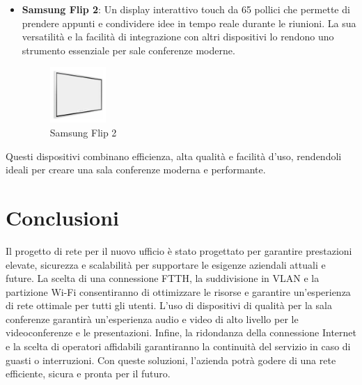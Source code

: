 \documentclass{assignment}
\begin{document}
\begin{itemize}
    \item \textbf{Samsung Flip 2}: Un display interattivo touch da 65 pollici che permette di prendere appunti e condividere idee in tempo reale durante le riunioni. La sua versatilità e la facilità di integrazione con altri dispositivi lo rendono uno strumento essenziale per sale conferenze moderne.
    \begin{figure}[H]
        \centering
        \includegraphics[width=0.2\textwidth]{assets/samsung_flip_2.jpg}
        \caption{Samsung Flip 2}
    \end{figure}
\end{itemize}


Questi dispositivi combinano efficienza, alta qualità e facilità d'uso, rendendoli ideali per creare una sala conferenze moderna e performante.



\section{Conclusioni}
Il progetto di rete per il nuovo ufficio è stato progettato per garantire prestazioni elevate, sicurezza e scalabilità per supportare le esigenze aziendali attuali e future. La scelta di una connessione FTTH, la suddivisione in VLAN e la partizione Wi-Fi consentiranno di ottimizzare le risorse e garantire un'esperienza di rete ottimale per tutti gli utenti. L'uso di dispositivi di qualità per la sala conferenze garantirà un'esperienza audio e video di alto livello per le videoconferenze e le presentazioni. Infine, la ridondanza della connessione Internet e la scelta di operatori affidabili garantiranno la continuità del servizio in caso di guasti o interruzioni. Con queste soluzioni, l'azienda potrà godere di una rete efficiente, sicura e pronta per il futuro.
\end{document}
